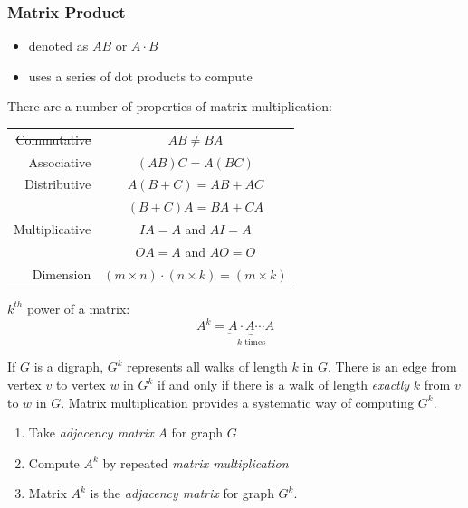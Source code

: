 \subsubsection*{Matrix Product}
\begin{itemize}
  \item denoted as $AB$ or $A \cdot B$
  \item uses a series of dot products to compute
\end{itemize}
There are a number of properties of matrix multiplication:
\begin{center}
  \begin{tabular}{rc}
    \sout{Commutative} & $AB \not = BA$                                   \\
    Associative        & $(AB)C = A(BC)$                                  \\
    Distributive       & $A(B + C) = AB + AC$                             \\
                       & $(B+C)A = BA + CA$                               \\
    Multiplicative     & $IA = A$ and $AI = A$                            \\
                       & $OA = A$ and $AO = O$                            \\
    Dimension          & $(m \times n) \cdot (n \times k) = (m \times k)$
  \end{tabular}
\end{center}
$k^{th}$ power of a matrix:
\[
  A^k = \underbrace{A \cdot A \cdots A}_{k \text{ times}}
\]

If $G$ is a digraph, $G^k$ represents all walks of length $k$ in $G$.
There is an edge from vertex $v$ to vertex $w$ in $G^k$ if and only if there is a walk of length \textit{exactly}
$k$ from $v$ to $w$ in $G$. Matrix multiplication provides a systematic way of computing $G^k$.
\begin{enumerate}
  \item Take \textit{adjacency matrix} $A$ for graph $G$
  \item Compute $A^k$ by repeated \textit{matrix multiplication}
  \item Matrix $A^k$ is the \textit{adjacency matrix} for graph $G^k$.
\end{enumerate}

